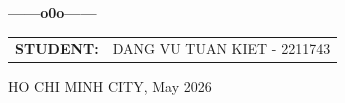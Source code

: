 \begin{titlepage}
\begin{center}
\begin{tabular}{l l}
    \end{tabular}
    
    \textbf{------o0o------}

    
    \begin{tabular}{l l}
        \textbf{STUDENT:} & DANG VU TUAN KIET - 2211743 \\
    \end{tabular}

    \vspace{1cm}

    HO CHI MINH CITY, May 2026

\end{center}

\end{titlepage}